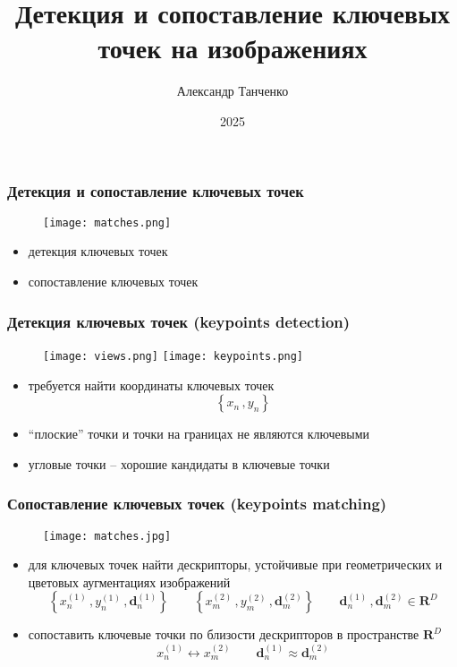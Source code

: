 \documentclass[12pt, usepdftitle=false, aspectratio=1610]{beamer}
\title[Лекция 5]{Детекция и сопоставление ключевых точек на изображениях}
\author{Александр Танченко}
\institute{}
\date{2025}
\begin{document}
\begin{frame}
    \titlepage
\end{frame}

\begin{frame}
\frametitle{Детекция и сопоставление ключевых точек}
\begin{figure}
    \centering
    \texttt{[image: matches.png]}
\end{figure}
\begin{itemize}
    \item детекция ключевых точек
    \item сопоставление ключевых точек
\end{itemize}
\end{frame}

\begin{frame}
\frametitle{Детекция ключевых точек (keypoints detection)}
\begin{figure}
    \centering
    \texttt{[image: views.png]}
    \texttt{[image: keypoints.png]}
\end{figure}
\begin{itemize}
    \item требуется найти координаты ключевых точек
    $$
        \left\{x_n\,,y_n\right\}
    $$
    \item ``плоские'' точки и точки на границах не являются ключевыми
    \item угловые точки -- хорошие кандидаты в ключевые точки
\end{itemize}
\end{frame}

\begin{frame}
\frametitle{Сопоставление ключевых точек (keypoints matching)}
\begin{figure}
    \centering
    \texttt{[image: matches.jpg]}
\end{figure}
\begin{itemize}
    \item для ключевых точек найти дескрипторы, устойчивые при геометрических и цветовых аугментациях изображений
    $$
        \left\{x^{(1)}_n\,,y^{(1)}_n\,,\mathbf{d}^{(1)}_n\right\}\qquad
        \left\{x^{(2)}_m\,,y^{(2)}_m\,,\mathbf{d}^{(2)}_m\right\}\qquad
        \mathbf{d}^{(1)}_n\,,\mathbf{d}^{(2)}_m\in\mathbf{R}^D
    $$
    \item сопоставить ключевые точки по близости дескрипторов в пространстве $\mathbf{R}^D$
    $$
        x^{(1)}_n\leftrightarrow x^{(2)}_m 
        \qquad
        \mathbf{d}^{(1)}_n\approx\mathbf{d}^{(2)}_m
    $$
\end{itemize}
\end{frame}
\end{document}
